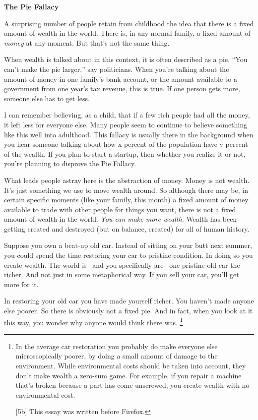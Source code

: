\documentclass[12pt]{book}
\begin{document}
\textbf{The Pie Fallacy}

A surprising number of people retain from childhood the idea that there
is a fixed amount of wealth in the world. There is, in any normal
family, a fixed amount of \emph{money} at any moment. But that's not the
same thing.

When wealth is talked about in this context, it is often described as a
pie. ``You can't make the pie larger,'' say politicians. When you're
talking about the amount of money in one family's bank account, or the
amount available to a government from one year's tax revenue, this is
true. If one person gets more, someone else has to get less.

I can remember believing, as a child, that if a few rich people had all
the money, it left less for everyone else. Many people seem to continue
to believe something like this well into adulthood. This fallacy is
usually there in the background when you hear someone talking about how
x percent of the population have y percent of the wealth. If you plan to
start a startup, then whether you realize it or not, you're planning to
disprove the Pie Fallacy.

What leads people astray here is the abstraction of money. Money is not
wealth. It's just something we use to move wealth around. So although
there may be, in certain specific moments (like your family, this month)
a fixed amount of money available to trade with other people for things
you want, there is not a fixed amount of wealth in the world. \emph{You
can make more wealth.} Wealth has been getting created and destroyed
(but on balance, created) for all of human history.

Suppose you own a beat-up old car. Instead of sitting on your butt next
summer, you could spend the time restoring your car to pristine
condition. In doing so you create wealth. The world is-- and you
specifically are-- one pristine old car the richer. And not just in some
metaphorical way. If you sell your car, you'll get more for it.

In restoring your old car you have made yourself richer. You haven't
made anyone else poorer. So there is obviously not a fixed pie. And in
fact, when you look at it this way, you wonder why anyone would think
there was. \footnote{In the average car restoration you probably do make everyone
else microscopically poorer, by doing a small amount of damage to the
environment. While environmental costs should be taken into account,
they don't make wealth a zero-sum game. For example, if you repair a
machine that's broken because a part has come unscrewed, you create
wealth with no environmental cost.

{[}5b{]} This essay was written before Firefox.}
\end{document}

